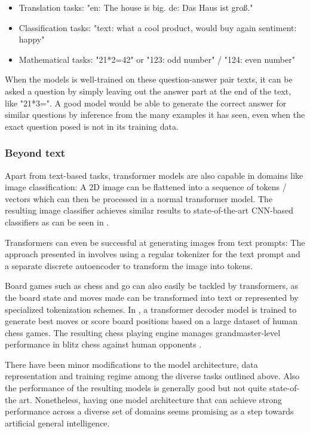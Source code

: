 \begin{itemize}
\item Translation tasks: "en: The house is big.  de: Das Haus ist groß."
\item Classification tasks: "text:  what a cool product, would buy again  sentiment: happy"
\item Mathematical tasks: "21*2=42" or "123: odd number" / "124: even number" 
\end{itemize}

When the models is well-trained on these question-answer pair texts, it can be asked a question by simply leaving out the answer part at the end of the text, like "21*3=". \cite{alammar-transformer} A good model would be able to generate the correct answer for similar questions by inference from the many examples it has seen, even when the exact question posed is not in its training data.

\subsubsection{Beyond text}

Apart from text-based tasks, transformer models are also capable in domains like image classification:
A 2D image can be flattened into a sequence of tokens / vectors which can then be processed in a normal transformer model. The resulting image classifier achieves similar results to state-of-the-art CNN-based classifiers as can be seen in .

Transformers can even be successful at generating images from text prompts: The approach presented in \cite{cogview} involves using a regular tokenizer for the text prompt and a separate discrete autoencoder to transform the image into tokens.

Board games such as chess and go can also easily be tackled by transformers, as the board state and moves made can be transformed into text or represented by specialized tokenization schemes.
In \cite{grandmasterlevelchess}, a transformer decoder model is trained to generate best moves or score board positions based on a large dataset of human chess games. The resulting chess playing engine manages grandmaster-level performance in blitz chess against human opponents .

There have been minor modifications to the model architecture, data representation and training regime among the diverse tasks outlined above. Also the performance of the resulting models is generally good but not quite state-of-the art. Nonetheless, having one model architecture that can achieve strong performance across a diverse set of domains seems promising as a step towards artificial general intelligence.


